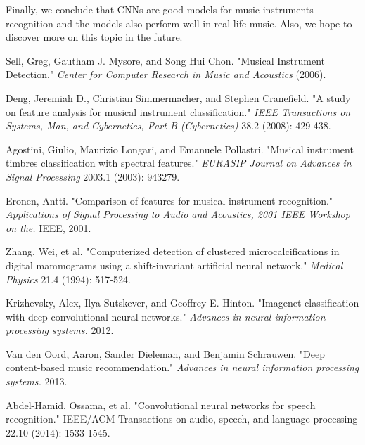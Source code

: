 \documentclass{article}
\begin{document}
\noindent Finally, we conclude that CNNs are good models for music instruments recognition and the models also perform well in real life music. Also, we hope to discover more on this topic in the future.






\begin{thebibliography}{9}

Sell, Greg, Gautham J. Mysore, and Song Hui Chon. "Musical Instrument Detection." \textit{Center for Computer Research in Music and Acoustics} (2006).

Deng, Jeremiah D., Christian Simmermacher, and Stephen Cranefield. "A study on feature analysis for musical instrument classification." \textit{IEEE Transactions on Systems, Man, and Cybernetics, Part B (Cybernetics)} 38.2 (2008): 429-438.

Agostini, Giulio, Maurizio Longari, and Emanuele Pollastri. "Musical instrument timbres classification with spectral features." \textit{EURASIP Journal on Advances in Signal Processing} 2003.1 (2003): 943279.

Eronen, Antti. "Comparison of features for musical instrument recognition." \textit{Applications of Signal Processing to Audio and Acoustics, 2001 IEEE Workshop on the.} IEEE, 2001.

Zhang, Wei, et al. "Computerized detection of clustered microcalcifications in digital mammograms using a shift‐invariant artificial neural network." \textit{Medical Physics} 21.4 (1994): 517-524.

Krizhevsky, Alex, Ilya Sutskever, and Geoffrey E. Hinton. "Imagenet classification with deep convolutional neural networks." \textit{Advances in neural information processing systems.} 2012.

Van den Oord, Aaron, Sander Dieleman, and Benjamin Schrauwen. "Deep content-based music recommendation." \textit{Advances in neural information processing systems.} 2013.

Abdel-Hamid, Ossama, et al. "Convolutional neural networks for speech recognition." IEEE/ACM Transactions on audio, speech, and language processing 22.10 (2014): 1533-1545.


\end{thebibliography}
\end{document}
